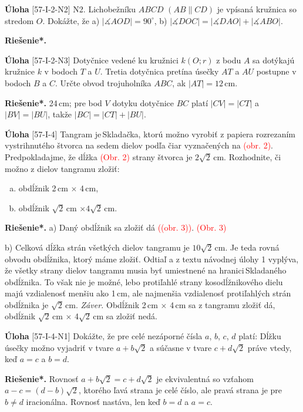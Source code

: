 \documentclass{article}
\newcommand{\rieh}{\textbf{Riešenie*.} }
\newcommand{\ma}{\measuredangle}
\newcommand\todo[1]{\noindent\textcolor{red}{(#1)}}
\newcommand{\problem}[3]{
  \begin{tcolorbox}[breakable,notitle,boxrule=0pt,colback=light-gray,colframe=light-gray]
    \textbf{Úloha}
    [#1] #2
  \end{tcolorbox}
  \noindent#3
}
\begin{document}
\problem{57-I-2-N2}{
N2. Lichobežníku $ABCD$ $(AB \parallel CD)$ je vpísaná kružnica so stredom $O$. Dokážte, že
a) $|\ma AOD| = 90^\circ$, b) $|\ma DOC| = |\ma DAO| + |\ma ABO|$.
}{
\rieh
}


\problem{57-I-2-N3}{
Dotyčnice vedené ku kružnici $k(O; r)$ z bodu $A$ sa dotýkajú kružnice $k$ v bodoch $T$
a $U$. Tretia dotyčnica pretína úsečky $AT$ a $AU$ postupne v bodoch $B$ a $C$. Určte obvod
trojuholníka $ABC$, ak $|AT| = 12$\,cm.
}{
\rieh 24\,cm; pre bod $V$ dotyku dotyčnice $BC$ platí $|CV|=|CT|$ a $|BV| =|BU|$, takže $|BC| =|CT| +|BU|$.
}


\problem{57-I-4}{
Tangram je\,Skladačka, ktorú možno vyrobiť z papiera rozrezaním vystrihnutého
štvorca na sedem dielov podľa čiar vyznačených na \todo{obr. 2}. Predpokladajme, že dĺžka
\todo{Obr. 2}
strany štvorca je $2\sqrt{2}$\,cm. Rozhodnite, či možno z dielov tangramu zložiť:
\begin{enumerate}[a)]
    \item obdĺžnik 2\,cm $\times$ 4\,cm,
    \item obdĺžnik $\sqrt{2}$\,cm $\times 4 \sqrt{2}$\,cm.
\end{enumerate}
}{
\rieh a) Daný obdĺžnik sa zložiť dá \todo{(obr. 3)}.
\todo{Obr. 3}

b) Celková dĺžka \uv{iracionálnych} strán všetkých dielov tangramu je $10\sqrt{2}$\,cm. Je
teda rovná obvodu obdĺžnika, ktorý máme zložiť. Odtiaľ a z textu návodnej úlohy 1 vyplýva, že všetky \uv{iracionálne} strany dielov tangramu musia byť umiestnené na hranici\,Skladaného obdĺžnika. To však nie je možné, lebo protiľahlé
\uv{iracionálne} strany kosodĺžnikového dielu majú vzdialenosť menšiu ako 1\,cm, ale najmenšia vzdialenosť protiľahlých strán obdĺžnika je $\sqrt{2}$\,cm.
\textit{Záver.} Obdĺžnik 2\,cm $\times$ 4\,cm sa z tangramu zložiť dá, obdĺžnik $\sqrt{2}$\,cm $\times$ 4$\sqrt{2}$\,cm sa zložiť nedá.
}


\problem{57-I-4-N1}{
Dokážte, že pre celé nezáporné čísla $a$, $b$, $c$, $d$ platí: Dĺžku úsečky možno vyjadriť
v tvare $a + b\sqrt{2}$ a súčasne v tvare $c + d\sqrt{2}$ práve vtedy, keď $a = c$ a $b = d$. 
}{
\rieh Rovnosť $a + b \sqrt{2}= c + d\sqrt{2}$ je ekvivalentná so vzťahom $a-c = (d-b)\sqrt{2}$, ktorého ľavá strana je celé číslo, ale pravá strana je pre $b \neq d$ iracionálna. Rovnosť nastáva, len keď $b = d$ a $a = c$.
}
\end{document}
